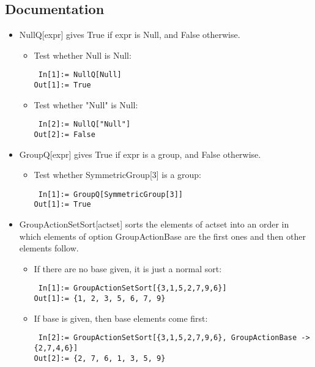\subsection{Documentation}

\begin{itemize}

\item NullQ[expr] gives True if expr is Null, and False otherwise.
\begin{itemize}
\item Test whether Null is Null:
\begin{lstlisting}
 In[1]:= NullQ[Null]
Out[1]:= True
\end{lstlisting}
\item Test whether "Null" is Null:
\begin{lstlisting}
 In[2]:= NullQ["Null"]
Out[2]:= False
\end{lstlisting}
\end{itemize}

\item GroupQ[expr] gives True if expr is a group, and False otherwise.
\begin{itemize}
\item Test whether SymmetricGroup[3] is a group:
\begin{lstlisting}
 In[1]:= GroupQ[SymmetricGroup[3]]
Out[1]:= True
\end{lstlisting}
\end{itemize}

\item GroupActionSetSort[actset] sorts the elements of actset into an order in which elements of option GroupActionBase are the first ones and then other elements follow.
\begin{itemize}
\item If there are no base given, it is just a normal sort:
\begin{lstlisting}
 In[1]:= GroupActionSetSort[{3,1,5,2,7,9,6}]
Out[1]:= {1, 2, 3, 5, 6, 7, 9}
\end{lstlisting}
\item If base is given, then base elements come first:
\begin{lstlisting}
 In[2]:= GroupActionSetSort[{3,1,5,2,7,9,6}, GroupActionBase -> {2,7,4,6}]
Out[2]:= {2, 7, 6, 1, 3, 5, 9}
\end{lstlisting}
\end{itemize}


\end{itemize}
